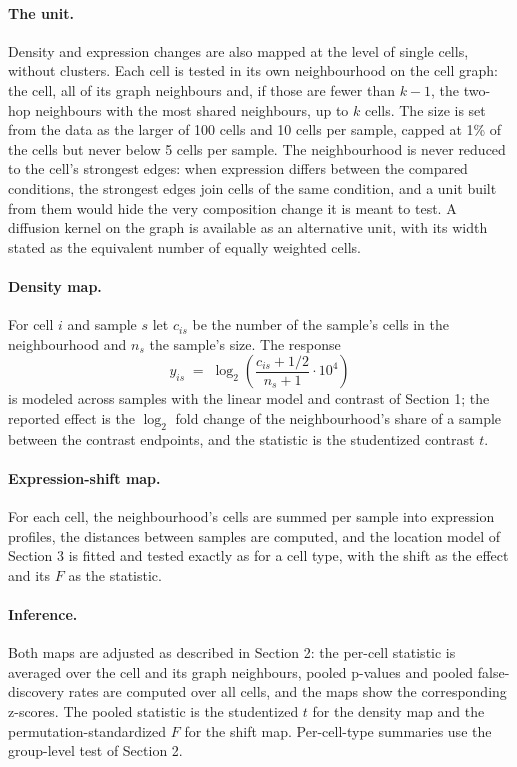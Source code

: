 \documentclass{article}
\begin{document}
\paragraph{The unit.}
Density and expression changes are also mapped at the level of single cells, without clusters. Each cell is tested in its own neighbourhood on the cell graph: the cell, all of its graph neighbours and, if those are fewer than $k - 1$, the two-hop neighbours with the most shared neighbours, up to $k$ cells. The size is set from the data as the larger of 100 cells and 10 cells per sample, capped at 1\% of the cells but never below 5 cells per sample. The neighbourhood is never reduced to the cell's strongest edges: when expression differs between the compared conditions, the strongest edges join cells of the same condition, and a unit built from them would hide the very composition change it is meant to test. A diffusion kernel on the graph is available as an alternative unit, with its width stated as the equivalent number of equally weighted cells.

\paragraph{Density map.}
For cell $i$ and sample $s$ let $c_{is}$ be the number of the sample's cells in the neighbourhood and $n_s$ the sample's size. The response
\begin{equation}
y_{is} \;=\; \log_2\!\left(\frac{c_{is} + 1/2}{n_s + 1}\cdot 10^{4}\right)
\end{equation}
is modeled across samples with the linear model and contrast of Section 1; the reported effect is the $\log_2$ fold change of the neighbourhood's share of a sample between the contrast endpoints, and the statistic is the studentized contrast $t$.

\paragraph{Expression-shift map.}
For each cell, the neighbourhood's cells are summed per sample into expression profiles, the distances between samples are computed, and the location model of Section 3 is fitted and tested exactly as for a cell type, with the shift as the effect and its $F$ as the statistic.

\paragraph{Inference.}
Both maps are adjusted as described in Section 2: the per-cell statistic is averaged over the cell and its graph neighbours, pooled p-values and pooled false-discovery rates are computed over all cells, and the maps show the corresponding z-scores. The pooled statistic is the studentized $t$ for the density map and the permutation-standardized $F$ for the shift map. Per-cell-type summaries use the group-level test of Section 2.
\end{document}
